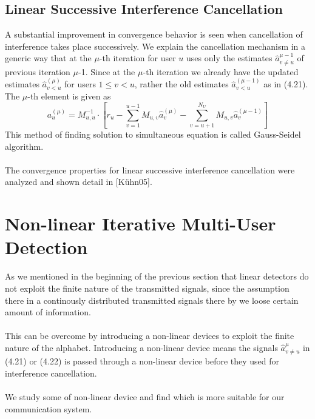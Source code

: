 \subsection{Linear Successive Interference Cancellation}
A substantial improvement in convergence behavior is seen when cancellation of interference takes place successively. We explain the cancellation mechanism in a generic way that at the $\mu$-th iteration for user $u$ uses only the estimates $\hat{a}_{v\ne u}^{\mu-1}$ of previous iteration $\mu$-1. Since at the $\mu$-th iteration we already have the updated estimates $\hat{a}_{v<u}^{(\mu)}$ for users $1\leq v < u$, rather the old estimates $\hat{a}_{v<u}^{(\mu-1)}$ as in (4.21).  The $\mu$-th element is given as 
\begin{equation}
a_u^{(\mu)}=M_{u,u}^{-1}\cdot \left[r_u-\sum\limits_{v=1}^{u-1}M_{u,v}\hat{a}_v^{(\mu)}-\sum\limits_{v=u+1}^{N_U}M_{u,v}\hat{a}_v^{(\mu-1)}\right]
\end{equation}
This method of finding solution to simultaneous equation is called Gauss-Seidel algorithm.\\ \\
The convergence properties for linear successive interference cancellation were analyzed and shown detail in [K\"uhn05].
\section{Non-linear Iterative Multi-User Detection}
As we mentioned in the beginning of the previous section that linear detectors do not exploit the finite nature of the transmitted signals, since the assumption there in a continously distributed transmitted signals there by we loose certain amount of information. \\ \\
This can be overcome by introducing a non-linear devices to exploit the finite nature of the alphabet. Introducing a non-linear device means the signals $\hat{a}_{v\ne u}^{\mu}$ in (4.21) or (4.22) is passed through a non-linear device before they used for interference cancellation. \\ \\
We study some of non-linear device and find which is more suitable for our communication system.
